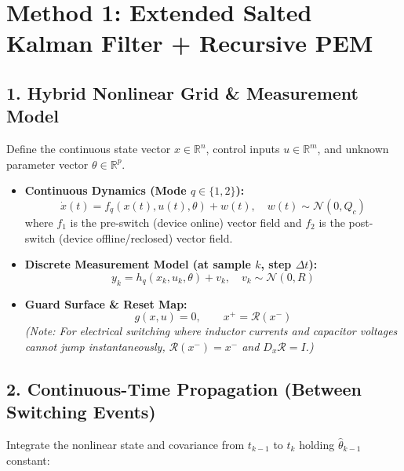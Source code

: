 \documentclass{article}
\begin{document}
\section*{Method 1: Extended Salted Kalman Filter + Recursive PEM}

\subsection*{1. Hybrid Nonlinear Grid \& Measurement Model}
Define the continuous state vector $x \in \mathbb{R}^n$, control inputs $u \in \mathbb{R}^m$, and unknown parameter vector $\theta \in \mathbb{R}^p$.

\begin{itemize}
    \item \textbf{Continuous Dynamics (Mode $q \in \{1, 2\}$):}
    \begin{equation}
        \dot{x}(t) = f_q(x(t), u(t), \theta) + w(t), \quad w(t) \sim \mathcal{N}(0, Q_c)
    \end{equation}
    where $f_1$ is the pre-switch (device online) vector field and $f_2$ is the post-switch (device offline/reclosed) vector field.
    
    \item \textbf{Discrete Measurement Model (at sample $k$, step $\Delta t$):}
    \begin{equation}
        y_k = h_q(x_k, u_k, \theta) + v_k, \quad v_k \sim \mathcal{N}(0, R)
    \end{equation}
    
    \item \textbf{Guard Surface \& Reset Map:}
    \begin{equation}
        g(x, u) = 0, \qquad x^+ = \mathcal{R}(x^-)
    \end{equation}
    \textit{(Note: For electrical switching where inductor currents and capacitor voltages cannot jump instantaneously, $\mathcal{R}(x^-) = x^-$ and $D_x \mathcal{R} = I$.)}
\end{itemize}

\subsection*{2. Continuous-Time Propagation (Between Switching Events)}
Integrate the nonlinear state and covariance from $t_{k-1}$ to $t_k$ holding $\hat{\theta}_{k-1}$ constant:
\end{document}

